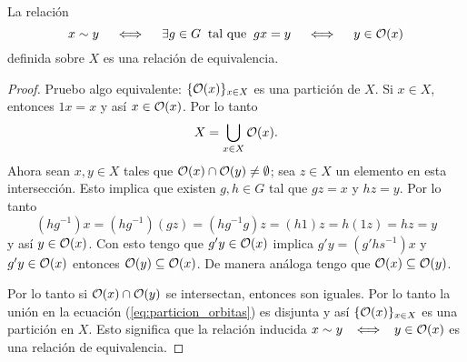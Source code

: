 \begin{ejercicio}\label{ej:}
  La relaci\'on
  \[
    x\sim y \quad\iff\quad \exists g\in G \;\;\text{tal que}\;\; gx=y \quad\iff\quad y\in \mathcal{O}(x)
  \]
  definida sobre $X$ es una relaci\'on de equivalencia.
\end{ejercicio}
\begin{proof}%
  Pruebo algo equivalente: $\{\mathcal{O}(x)\}_{x\in X}$ es una partici\'on de $X$. Si $x\in X$, entonces
  $1x=x$ y as\'i $x\in\mathcal{O}(x)$. Por lo tanto
  \begin{equation}\label{eq:particion_orbitas}
    X=\bigcup_{x\in X}\mathcal{O}(x).
  \end{equation}
  Ahora sean $x,y\in X$ tales que $\mathcal{O}(x)\cap\mathcal{O}(y)\neq\emptyset$; sea $z\in X$ un elemento en
  esta intersecci\'on. Esto implica que existen $g,h\in G$ tal que $gz=x$ y $hz=y$. Por lo tanto
  \[
    (h g^{-1})x=(hg^{-1})(gz)=(hg^{-1}g)z=(h 1)z=h(1z)=hz=y
  \]
  y as\'i $y\in\mathcal{O}(x)$. Con esto tengo que $g'y\in\mathcal{O}(x)$ implica $g'y=(g'hs^{-1})x$ y
  $g'y\in\mathcal{O}(x)$ entonces $\mathcal{O}(y)\subseteq\mathcal{O}(x)$. De manera an\'aloga tengo que
  $\mathcal{O}(x)\subseteq\mathcal{O}(y)$.

  Por lo tanto si $\mathcal{O}(x)\cap\mathcal{O}(y)$ se intersectan, entonces son iguales. Por lo tanto la
  uni\'on en la ecuaci\'on (\ref{eq:particion_orbitas}) es disjunta y as\'i $\{\mathcal{O}(x)\}_{x\in X}$
  es una partici\'on en $X$. Esto significa que la relaci\'on inducida
  $x\sim y \;\;\iff\;\; y\in\mathcal{O}(x)$ es una relaci\'on de equivalencia.
\end{proof}%

